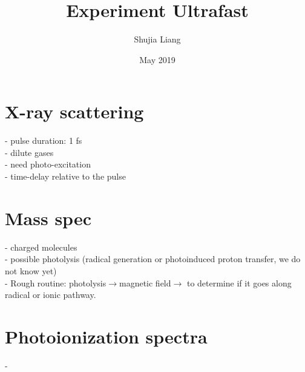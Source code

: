 \documentclass{article}
\title{Experiment Ultrafast}
\author{Shujia Liang }
\date{May 2019}
\begin{document}
\maketitle

\section{X-ray scattering}
- pulse duration: 1 fs
\\
- dilute gases
\\
- need photo-excitation
\\
- time-delay relative to the pulse
\section{Mass spec}
- charged molecules
\\
- possible photolysis (radical generation or photoinduced proton transfer, we do not know yet)
\\
- Rough routine: photolysis$\rightarrow$magnetic field$\rightarrow$ to determine if it goes along radical or ionic pathway.
\section{Photoionization spectra}
- 
\end{document}

